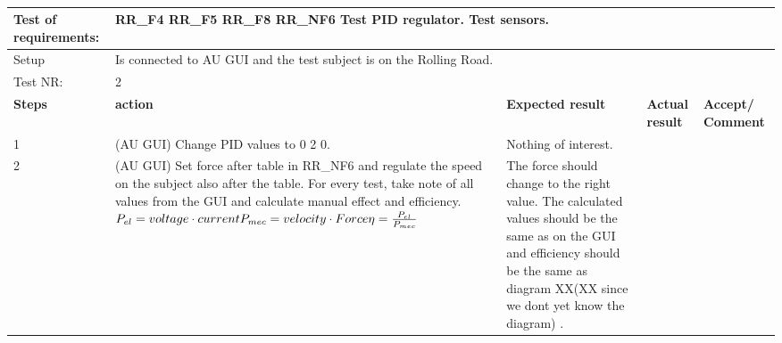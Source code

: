 \begin{table}[h!]
	\centering
	\label{my-label}	
	\begin{tabular}{|p{1.5 cm}|p{4.2 cm}|p{2.1 cm}|p{2.1 cm}|p{2.1 cm}|}
		\hline
		Test of requirements: 
		& \multicolumn{4}{l|}{RR\_F4 RR\_F5 RR\_F8 RR\_NF6 Test PID regulator. Test sensors.} \\ \hline
		Setup 
		& \multicolumn{4}{l|}{Is connected to AU GUI and the test subject is on the Rolling Road.} \\ \hline
		Test NR:
		& \multicolumn{4}{l|}{2} \\ \hline
		\textbf{Steps} & \textbf{action} & \textbf{Expected result} & 
		\textbf{Actual result} & \textbf{Accept/ Comment} \\ \hline
		1 
		& (AU GUI) Change PID values to 0 2 0. 
		& Nothing of interest.
		&
		& \\ \hline
		2
		& (AU GUI) Set force after table in RR\_NF6 and regulate the speed on the subject also after the table. For every test, take note of all values from the GUI and calculate manual effect and efficiency.\newline \newline
		$P_{el} = voltage \cdot current \newline \newline
		P_{mec} = velocity \cdot Force \newline \newline
		\eta = \frac{P_{el}}{P_{mec}}$ 
		& The force should change to the right value. The calculated values should be the same as on the GUI and efficiency should be the same as diagram XX(XX since we dont yet know the diagram) \fxnote{reference til diagram LB}.
		&
		& \\ \hline
	\end{tabular}
	\caption{}
\end{table}

